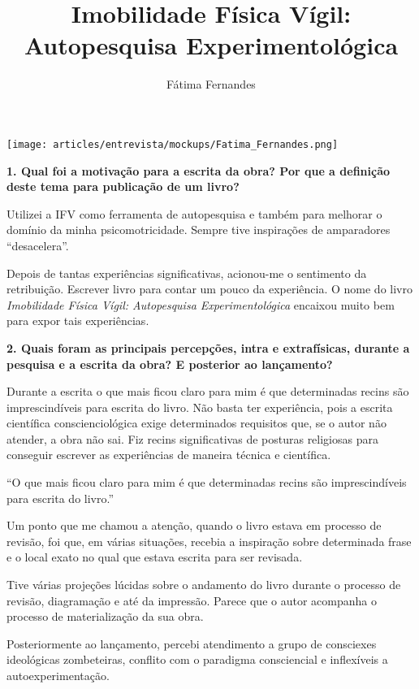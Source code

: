 \documentclass{gescons}
\author{Fátima Fernandes}
\title{Imobilidade Física Vígil: Autopesquisa Experimentológica}
\begin{document}
    \makeentrevistatitle

    \begin{multicols}{2}

\begin{center}
    \texttt{[image: articles/entrevista/mockups/Fatima\_Fernandes.png]}
\end{center}


\textbf{1. Qual foi a motivação para a escrita da obra? Por que a definição deste tema para publicação de um livro?}

Utilizei a IFV como ferramenta de autopesquisa e também para melhorar o domínio da minha psicomotricidade. Sempre tive inspirações de amparadores ``desacelera''.

Depois de tantas experiências significativas, acionou-me o sentimento da retribuição. Escrever livro para contar um pouco da experiência. O nome do livro \emph{Imobilidade Física Vígil: Autopesquisa Experimentológica} encaixou muito bem para expor tais experiências.


\textbf{2. Quais foram as principais percepções, intra e extrafísicas, durante a pesquisa e a escrita da obra? E posterior ao lançamento?}

Durante a escrita o que mais ficou claro para mim é que determinadas recins são imprescindíveis para escrita do livro. Não basta ter experiência, pois a escrita científica conscienciológica exige determinados requisitos que, se o autor não atender, a obra não sai. Fiz recins significativas de posturas religiosas para conseguir escrever as experiências de maneira técnica e científica.

\begin{pullquote}
``O  que mais ficou claro para mim é que determinadas recins são imprescindíveis para escrita do livro.''
\end{pullquote}

Um ponto que me chamou a atenção, quando o livro estava em processo de revisão, foi que, em várias situações, recebia a inspiração sobre determinada frase e o local exato no qual que estava escrita para ser revisada.

Tive várias projeções lúcidas sobre o andamento do livro durante o processo de revisão, diagramação e até da impressão. Parece que o autor acompanha o processo de materialização da sua obra.

Posteriormente ao lançamento, percebi atendimento a grupo de consciexes ideológicas zombeteiras, conflito com o paradigma consciencial e inflexíveis a autoexperimentação.


\end{multicols}
\end{document}
